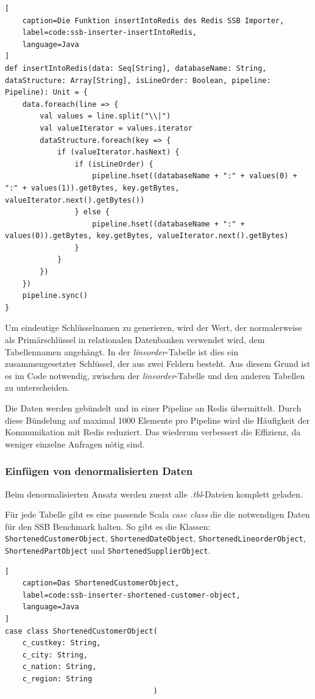 \begin{lstlisting}[
    caption=Die Funktion insertIntoRedis des Redis SSB Importer,
    label=code:ssb-inserter-insertIntoRedis,
    language=Java
]
def insertIntoRedis(data: Seq[String], databaseName: String, dataStructure: Array[String], isLineOrder: Boolean, pipeline: Pipeline): Unit = {
	data.foreach(line => {
		val values = line.split("\\|")
		val valueIterator = values.iterator
		dataStructure.foreach(key => {
			if (valueIterator.hasNext) {
				if (isLineOrder) {
					pipeline.hset((databaseName + ":" + values(0) + ":" + values(1)).getBytes, key.getBytes, valueIterator.next().getBytes())
				} else {
					pipeline.hset((databaseName + ":" + values(0)).getBytes, key.getBytes, valueIterator.next().getBytes)
				}
			}
		})
	})
	pipeline.sync()
}
\end{lstlisting}

Um eindeutige Schlüsselnamen zu generieren, wird der Wert, der normalerweise als Primärschlüssel in relationalen Datenbanken verwendet wird, dem Tabellennamen angehängt. In der \emph{lineorder}-Tabelle ist dies ein zusammengesetzter Schlüssel, der aus zwei Feldern besteht. Aus diesem Grund ist es im Code notwendig, zwischen der \emph{lineorder}-Tabelle und den anderen Tabellen zu unterscheiden.

Die Daten werden gebündelt und in einer Pipeline an Redis übermittelt. Durch diese Bündelung auf maximal 1000 Elemente pro Pipeline wird die Häufigkeit der Kommunikation mit Redis reduziert. Das wiederum verbessert die Effizienz, da weniger einzelne Anfragen nötig sind.


\subsubsection{Einfügen von denormalisierten Daten}\label{sec:ssb-inserter-denormalized}
Beim denormalisierten Ansatz werden zuerst alle \emph{.tbl}-Dateien komplett geladen.

Für jede Tabelle gibt es eine passende Scala \emph{case class} die die notwendigen Daten für den SSB Benchmark halten.
So gibt es die Klassen:\\
\lstinline|ShortenedCustomerObject|, \lstinline|ShortenedDateObject|, \lstinline|ShortenedLineorderObject|, \\\lstinline|ShortenedPartObject| und \lstinline|ShortenedSupplierObject|.

\begin{lstlisting}[
    caption=Das ShortenedCustomerObject,
    label=code:ssb-inserter-shortened-customer-object,
    language=Java
]
case class ShortenedCustomerObject(
	c_custkey: String,
	c_city: String,
	c_nation: String,
	c_region: String
								  )
\end{lstlisting}


